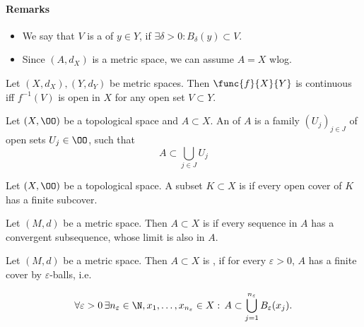 \paragraph{Remarks}
\begin{itemize}
    \item We say that $V$ is a  of $y\in Y$, if $\exists\delta>0: B_\delta(y)\subset V$.
    \item Since $(A,d_X)$ is a metric space, we can assume $A=X$ wlog.
\end{itemize}

\begin{cor}\label{i.14}
    Let $(X,d_X),(Y,d_Y)$ be metric spaces. Then $\func{f}{X}{Y}$ is continuous iff $f^{-1}(V)$ is open in $X$ for any open set $V\subset Y$.
\end{cor}

\begin{definition}\label{i.15}
    Let $(X,\OO)$ be a topological space and $A\subset X$. An  of $A$ is a family $(U_j)_{j\in J}$ of open sets $U_j\in\OO$, such that
    \[A\subset\bigcup_{j\in J}U_j\label{1.3}\tag{1.3}\]
\end{definition}

\begin{definition}\label{i.16}
    Let $(X,\OO)$ be a topological space. A subset $K\subset X$ is  if every open cover of $K$ has a finite subcover. 
\end{definition}

\begin{definition}\label{i.17}
    Let $(M,d)$ be a metric space. Then $A\subset X$ is  if every sequence in $A$ has a convergent subsequence, whose limit is also in $A$.
\end{definition}

\begin{definition}\label{i.18}
    Let $(M,d)$ be a metric space. Then $A\subset X$ is , if for every $\varepsilon>0$, $A$ has a finite cover by $\varepsilon$-balls, i.e.

    \[\forall\varepsilon>0\,\exists n_\varepsilon\in\N,x_1,\ldots,x_{n_\varepsilon}\in X:\, A\subset\bigcup_{j=1}^{n_\varepsilon}B_\varepsilon(x_j).\]
\end{definition}

